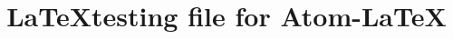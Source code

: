 \documentclass[journal]{IEEEtran}
\begin{document}
\title{\LaTeX testing file for Atom-LaTeX}

\maketitle


\end{document}
